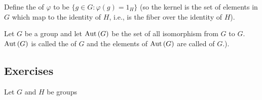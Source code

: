 \documentclass[10pt,a4paper]{report}
\begin{document}
\begin{definition}[Kernel]Define the  of $\varphi$ to be $\{g \in G : \varphi(g)=1_H\}$ (so the kernel is the set of elements in $G$ which map to the identity of $H$, i.e., is the fiber over the identity of $H$).
\end{definition}

\begin{definition}[Automophism]Let $G$ be a group and let $\text{Aut}\,(G)$ be the set of all isomorphism from $G$ to $G$.  $\text{Aut}\,(G)$ is called the  of $G$ and the elements of $\text{Aut}\,(G)$ are called  of $G$.).
\end{definition}

\subsection{Exercises}

Let $G$ and $H$ be groups
\end{document}
